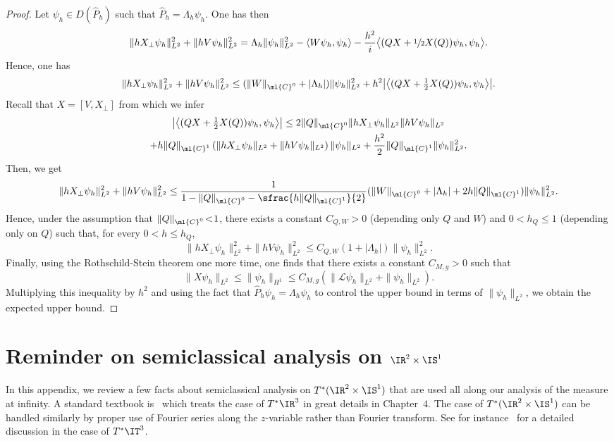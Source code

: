 \documentclass[10pt]{amsart}
\theoremstyle{plain}
\theoremstyle{definition}
\theoremstyle{remark}
\begin{document}
\begin{proof} Let $\psi_h\in D(\widehat{P}_h)$ such that $\widehat{P}_h=\Lambda_h\psi_h$. One has then
\[
\|hX_\perp\psi_h\|_{L^2}^2+\|hV\psi_h\|_{L^2}^2=\Lambda_h\|\psi_h\|_{L^2}^2-\langle W\psi_h,\psi_h\rangle-\frac{h^2}{i}\bigl\langle(QX+\sfrac{1}{2}X(Q))\psi_h,\psi_h\bigr\rangle.
\]
Hence, one has
\[
\|hX_\perp\psi_h\|_{L^2}^2+\|hV\psi_h\|_{L^2}^2\leq (\|W\|_{\ml{C}^0}+|\Lambda_h|)\|\psi_h\|_{L^2}^2+h^2\bigl|\bigl\langle(QX+\tfrac{1}{2}X(Q))\psi_h,\psi_h\bigr\rangle\bigr|.
\]
Recall that $X=[V,X_\perp]$ from which we infer
\begin{multline*}
\bigl|\bigl\langle(QX+\tfrac{1}{2}X(Q))\psi_h,\psi_h\bigr\rangle\bigr|\leq 2\|Q\|_{\ml{C}^0}\|hX_\perp\psi_h\|_{L^2}\|hV\psi_h\|_{L^2}\\
+ h\|Q\|_{\ml{C}^1}\left(\|hX_\perp\psi_h\|_{L^2}+ \|hV\psi_h\|_{L^2}\right)\|\psi_h\|_{L^2}
+ \frac{h^2}{2}\|Q\|_{\ml{C}^1}\|\psi_h\|_{L^2}^2.\end{multline*}
Then, we get
\[
\|hX_\perp\psi_h\|_{L^2}^2+\|hV\psi_h\|_{L^2}^2\leq \frac{1}{1-\|Q\|_{\ml{C}^0}-\sfrac{h\|Q\|_{\ml{C}^1}}{2}}(\|W\|_{\ml{C}^0}+|\Lambda_h|+2h\|Q\|_{\ml{C}^1})\|\psi_h\|_{L^2}^2.
\]
Hence, under the assumption that $\|Q\|_{\ml{C}^0}\!<\!1$, there exists a constant $C_{Q,W}\!>\!0$ (depend\-ing only $Q$ and $W$) and $0<h_Q\leq 1$ (depending only on $Q$) such that, for every $0<h\leq h_Q$,
\begin{equation}\label{e:bound-apriori-proof}\|hX_\perp\psi_h\|_{L^2}^2+\|hV\psi_h\|_{L^2}^2\leq C_{Q,W}(1+|\Lambda_h|)\|\psi_h\|_{L^2}^2.\end{equation}
Finally, using the Rothschild-Stein theorem one more time, one finds that there exists a constant $C_{M,g}>0$ such that
\[
\|X\psi_h\|_{L^2}\leq \|\psi_h \|_{H^1}\leq C_{M,g}\left(\|\mathcal{L}\psi_h\|_{L^2}+\|\psi_h\|_{L^2}\right).
\]
Multiplying this inequality by $h^2$ and using the fact that $\widehat{P}_h\psi_h=\Lambda_h\psi_h$ to control the upper bound in terms of $\|\psi_h\|_{L^2}$, we obtain the expected upper bound.
\end{proof}

\section{Reminder on semiclassical analysis on \texorpdfstring{$\IR^2\times\IS^1$}{RS}}\label{a:pdo}

In this appendix, we review a few facts about semiclassical analysis on $T^*(\IR^2\times\IS^1)$ that are used all along our analysis of the measure at infinity. A standard textbook is~\cite{Zworski12} which treats the case of $T^*\IR^3$ in great details in Chapter~$4$. The case of $T^*(\IR^2\times\IS^1)$ can be handled similarly by proper use of Fourier series along the $z$\nobreakdash-variable rather than Fourier transform. See for instance~\cite[\S 5.3]{Zworski12} for a detailed discussion in the case of $T^*\IT^3$.
\end{document}
